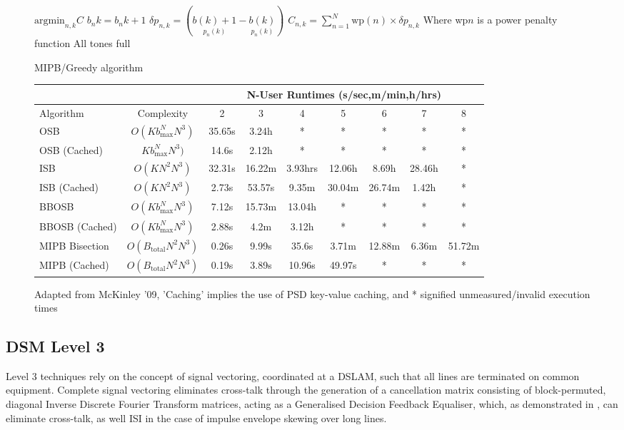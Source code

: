 \begin{figure}[h!]
\begin{algorithmic}
\REPEAT
\STATE \(\text{argmin}_{n,k} C\)
\STATE \(b_n{k}=b_n{k}+1\)
  \STATE \(\delta p_{n,k}=\left(\underset{p_n(k)}{b(k)+1} - \underset{p_n(k)}{b(k)}\right)\)
\ENDFOR
{}
    \STATE \(C_{n,k}=\sum\limits_{n=1}^N \text{wp}(n)\times\delta p_{n,k}\)
    \STATE Where wp\(n\) is a power penalty function
  \ENDFOR
\ENDFOR
\UNTIL All tones full
\end{algorithmic}
\caption{MIPB/Greedy algorithm}
\label{fig:MIPBAlgorithm}
\end{figure}

\begin{figure}[h!]
  \begin{tabularx}{1.1\textwidth}{|X|c|c|c|c|c|c|c|c|}\hline
  &&\multicolumn{7}{|c|}{N-User Runtimes (s/sec,m/min,h/hrs)}\\\hline
  Algorithm&Complexity&2&3&4&5&6&7&8\\\hline
  OSB&\(O(K b_{\text{max}}^N N^3)\)&35.65s&3.24h&*&*&*&*&*\\\hline
  OSB (Cached)&\(K b_{\text{max}}^N N^3)\)&14.6s&2.12h&*&*&*&*&*\\\hline
  ISB&\(O(K N^2 N^3)\)&32.31s&16.22m&3.93hrs&12.06h&8.69h&28.46h&*\\\hline
  ISB (Cached)&\(O(K N^2 N^3)\)&2.73s&53.57s&9.35m&30.04m&26.74m&1.42h&*\\\hline
  BBOSB&\(O(K b_{\text{max}}^N N^3)\)&7.12s&15.73m&13.04h&*&*&*&*\\\hline
  BBOSB (Cached)&\(O(K b_{\text{max}}^N N^3)\)&2.88s&4.2m&3.12h&*&*&*&*\\\hline
  MIPB Bisection&\(O(B_{\text{total}} N^2 N^3)\)&0.26s&9.99s&35.6s&3.71m&12.88m&6.36m&51.72m\\\hline
  MIPB (Cached)&\(O(B_{\text{total}} N^2 N^3)\)&0.19s&3.89s&10.96s&49.97s&*&*&*\\\hline
\end{tabularx}
\caption{Adapted from McKinley '09, 'Caching' implies the use of PSD key-value caching, and * signified unmeasured/invalid execution times}
\label{tab:TractibilityTable}
\end{figure}


\subsection{DSM Level 3}
Level 3 techniques rely on the concept of signal vectoring, coordinated at a DSLAM, such that all lines are terminated on common equipment. Complete signal vectoring eliminates cross-talk through the generation of a cancellation matrix consisting of block-permuted, diagonal Inverse Discrete Fourier Transform matrices, acting as a Generalised Decision Feedback Equaliser, which, as demonstrated in \cite{Cio97}, can eliminate cross-talk, as well ISI in the case of impulse envelope skewing over long lines.

